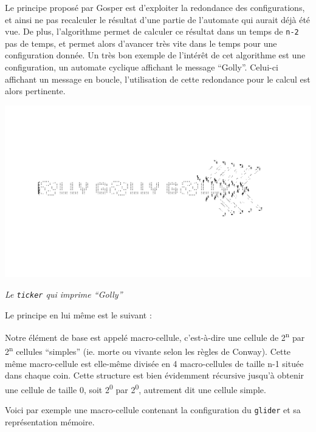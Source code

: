 \documentclass[a4paper,12pt]{report}
\begin{document}
Le principe proposé par Gosper est d'exploiter la redondance des
configurations, et ainsi ne pas recalculer le résultat d'une partie de
l'automate qui aurait déjà été vue. De plus, l'algorithme permet de
calculer ce résultat dans un temps de \texttt{n-2} pas de temps, et
permet alors d'avancer très vite dans le temps pour une configuration
donnée. Un très bon exemple de l'intérêt de cet algorithme est une
configuration, un automate cyclique affichant le message
``Golly''. Celui-ci affichant un message en boucle, l'utilisation de
cette redondance pour le calcul est alors pertinente.

\begin{center}
  \includegraphics[scale=0.5]{screenshot_ticker.png}

  \textit{Le \texttt{ticker} qui imprime ``Golly''}
\end{center}

Le principe en lui même est le suivant :

Notre élément de base est appelé macro-cellule, c'est-à-dire une cellule de
2\textsuperscript{n} par 2\textsuperscript{n} cellules ``simples'' (ie. morte ou
vivante selon les règles de Conway). Cette même macro-cellule est elle-même
divisée en 4 macro-cellules de taille n-1 située dans chaque coin. Cette
structure est bien évidemment récursive jusqu'à obtenir une cellule de taille 0,
soit 2\textsuperscript{0} par 2\textsuperscript{0}, autrement dit une cellule
simple.

\medskip

Voici par exemple une macro-cellule contenant la configuration du
\texttt{glider} et sa représentation mémoire.
\end{document}
